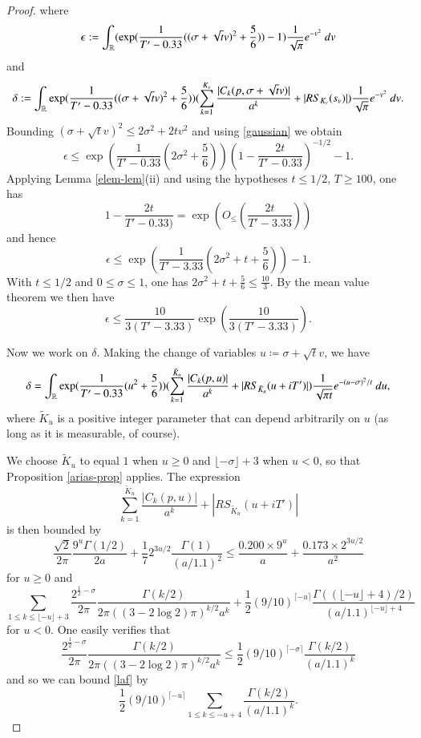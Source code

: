 \begin{proof}
where
$$ \epsilon := \int_{\mathbb{R}} ( \exp( \frac{1}{T'-0.33} ((\sigma + \sqrt{t} v)^2 + \frac{5}{6}) )  - 1) \frac{1}{\sqrt{\pi}} e^{-v^2}\ dv$$
and
$$ \delta := \int_{\mathbb{R}} \exp( \frac{1}{T'-0.33} ((\sigma + \sqrt{t} v)^2 + \frac{5}{6}) ) (\sum_{k=1}^{K_v} \frac{|C_k(p,\sigma+\sqrt{t}v)|}{a^k} + |RS_{K_v}(s_v)|) \frac{1}{\sqrt{\pi}} e^{-v^2}\ dv.$$
Bounding $(\sigma + \sqrt{t} v)^2 \leq 2 \sigma^2 + 2 t v^2$ and using \eqref{gaussian} we obtain
$$ \epsilon \leq \exp( \frac{1}{T'-0.33} (2\sigma^2 + \frac{5}{6}) ) (1 - \frac{2t}{T'-0.33})^{-1/2} - 1.$$
Applying Lemma \ref{elem-lem}(ii) and using the hypotheses $t \leq 1/2$, $T \geq 100$, one has
$$ 1 - \frac{2t}{T'-0.33)} = \exp( O_{\leq}( \frac{2t}{T'-3.33} ))$$
and hence
$$
 \epsilon \leq \exp( \frac{1}{T'-3.33} (2\sigma^2 + t + \frac{5}{6}) ) - 1.
$$
With $t \leq 1/2$ and $0 \leq \sigma \leq 1$, one has $2\sigma^2 + t + \frac{5}{6} \leq \frac{10}{3}$.  By the mean value theorem we then have
\begin{equation}\label{eep}
 \epsilon \leq \frac{10}{3(T'-3.33)} \exp( \frac{10}{3(T'-3.33)}).
\end{equation}

Now we work on $\delta$.  Making the change of variables $u \coloneqq \sigma + \sqrt{t} v$, we have
$$ \delta = \int_{\mathbb{R}} \exp( \frac{1}{T'-0.33} (u^2 + \frac{5}{6}) ) (\sum_{k=1}^{\tilde K_u} \frac{|C_k(p,u)|}{a^k} + |RS_{\tilde K_u}(u + iT')|) \frac{1}{\sqrt{\pi t}} e^{-(u-\sigma)^2/t}\ du,$$
where $\tilde K_u$ is a positive integer parameter that can depend arbitrarily on $u$ (as long as it is measurable, of course).  

We choose $\tilde K_u$ to equal $1$ when $u \geq 0$ and $\lfloor -\sigma \rfloor + 3$ when $u < 0$, so that Proposition \ref{arias-prop} applies.  The expression
$$ \sum_{k=1}^{\tilde K_u} \frac{|C_k(p,u)|}{a^k} + |RS_{\tilde K_u}(u + iT')| $$
is then bounded by
\begin{equation}\label{u0}
 \frac{\sqrt{2}}{2\pi} \frac{9^u \Gamma(1/2)}{2a} + \frac{1}{7} 2^{3u/2} \frac{\Gamma(1)}{(a/1.1)^2}
\leq \frac{0.200 \times 9^u}{a} + \frac{0.173 \times 2^{3u/2}}{a^2} 
\end{equation}
for $u \geq 0$ and
\begin{equation}\label{laf}
 \sum_{1 \leq k \leq \lfloor -u \rfloor+3} \frac{2^{\frac{1}{2}-\sigma}}{2\pi} \frac{\Gamma(k/2)}{2\pi ((3-2\log 2)\pi)^{k/2} a^k} + \frac{1}{2} (9/10)^{\lceil -u \rceil} \frac{\Gamma((\lfloor -u \rfloor+4)/2)}{(a/1.1)^{\lfloor -u \rfloor+4}}
\end{equation}
for $u < 0$.  One easily verifies that
$$ \frac{2^{\frac{1}{2}-\sigma}}{2\pi} \frac{\Gamma(k/2)}{2\pi ((3-2\log 2)\pi)^{k/2} a^k}
\leq \frac{1}{2} (9/10)^{\lceil -\sigma \rceil} \frac{\Gamma(k/2)}{(a/1.1)^k} $$
and so we can bound \eqref{laf} by
$$ \frac{1}{2} (9/10)^{\lceil -u \rceil} \sum_{1 \leq k \leq -u+4} \frac{\Gamma(k/2)}{(a/1.1)^k}.$$


\end{proof}
